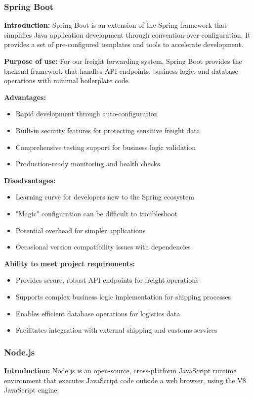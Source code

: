 \subsubsection{Spring Boot}
\textbf{Introduction:} Spring Boot \cite{spring_boot} is an extension of the Spring framework that simplifies Java application development through convention-over-configuration. It provides a set of pre-configured templates and tools to accelerate development.

\textbf{Purpose of use:} For our freight forwarding system, Spring Boot provides the backend framework that handles API endpoints, business logic, and database operations with minimal boilerplate code.

\textbf{Advantages:}
\begin{itemize}
    \item Rapid development through auto-configuration
    \item Built-in security features for protecting sensitive freight data
    \item Comprehensive testing support for business logic validation
    \item Production-ready monitoring and health checks
\end{itemize}

\textbf{Disadvantages:}
\begin{itemize}
    \item Learning curve for developers new to the Spring ecosystem
    \item "Magic" configuration can be difficult to troubleshoot
    \item Potential overhead for simpler applications
    \item Occasional version compatibility issues with dependencies
\end{itemize}

\textbf{Ability to meet project requirements:}
\begin{itemize}
    \item Provides secure, robust API endpoints for freight operations
    \item Supports complex business logic implementation for shipping processes
    \item Enables efficient database operations for logistics data
    \item Facilitates integration with external shipping and customs services
\end{itemize}

\subsubsection{Node.js}
\textbf{Introduction:} Node.js \cite{nodejs-intro} is an open-source, cross-platform JavaScript runtime environment that executes JavaScript code outside a web browser, using the V8 JavaScript engine.

